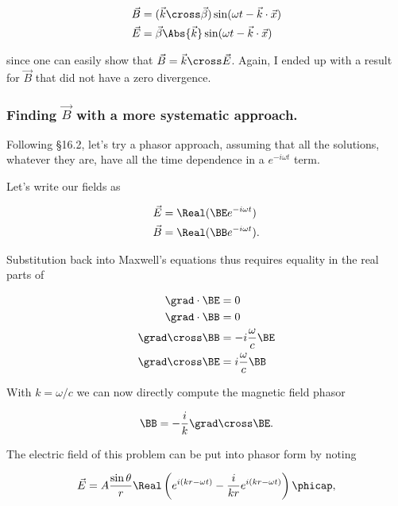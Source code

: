 \begin{align}\label{eqn:relElectroDynProblemSet4:480}
\vec{B} &= (\vec{k} \cross \vec{\beta}) \sin(\omega t - \vec{k} \cdot \vec{x}) \\
\vec{E} &= \vec{\beta} \Abs{\vec{k}} \sin(\omega t - \vec{k} \cdot \vec{x})
\end{align}

since one can easily show that $\vec{B} = \vec{k} \cross \vec{E}$.  Again, I ended up with a result for $\vec{B}$ that did not have a zero divergence.

\subsubsection{Finding $\vec{B}$ with a more systematic approach.}

Following \cite{jackson1975cew} \S 16.2, let's try a phasor approach, assuming that all the solutions, whatever they are, have all the time dependence in a $e^{-i\omega t}$ term.

Let's write our fields as

\begin{align}\label{eqn:relElectroDynProblemSet4:500}
\vec{E} &= \Real (\BE e^{-i \omega t}) \\
\vec{B} &= \Real (\BB e^{-i \omega t}).
\end{align}

Substitution back into Maxwell's equations thus requires equality in the real parts of

\begin{align}\label{eqn:relElectroDynProblemSet4:520}
\grad \cdot \BE &= 0 \\
\grad \cdot \BB &= 0 \\
\grad \cross \BB &= - i \frac{\omega}{c} \BE \\
\grad \cross \BE &= i \frac{\omega}{c} \BB
\end{align}

With $k = \omega/c$ we can now directly compute the magnetic field phasor

\begin{equation}\label{eqn:relElectroDynProblemSet4:540}
\BB = -\frac{i}{k} \grad \cross \BE.
\end{equation}

The electric field of this problem can be put into phasor form by noting

\begin{equation}\label{eqn:relElectroDynProblemSet4:560}
\vec{E} = A \frac{\sin\theta}{r} \Real \left( e^{i (k r - \omega t)} - \frac{i}{kr} e^{i(k r - \omega t)} \right) \phicap,
\end{equation}

